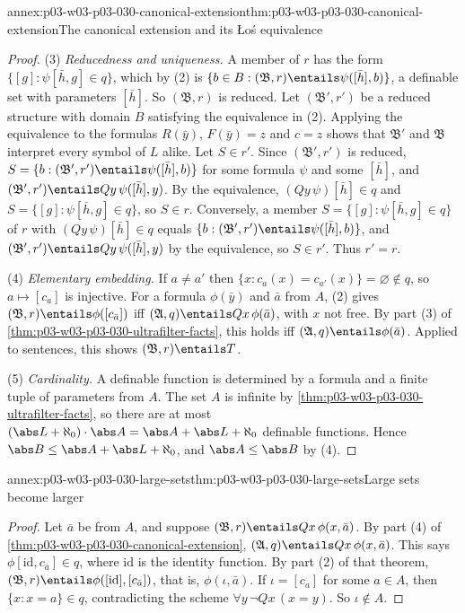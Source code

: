 \begin{annexitem}{annex:p03-w03-p03-030-canonical-extension}{thm:p03-w03-p03-030-canonical-extension}{The canonical extension and its \L o\'s equivalence}
\begin{proof}
(3) \emph{Reducedness and uniqueness.}  A member of \(r\) has the form
\(\{[g]:\psi[\bar h,g]\in q\}\), which by (2) is
\(\{b\in B:(\mathfrak B,r)\entails\psi([\bar h],b)\}\), a definable set with
parameters \([\bar h]\).  So \((\mathfrak B,r)\) is reduced.  Let
\((\mathfrak B',r')\) be a reduced structure with domain \(B\) satisfying the
equivalence in (2).  Applying the equivalence to the formulas
\(R(\bar y)\), \(F(\bar y)=z\) and \(c=z\) shows that \(\mathfrak B'\) and
\(\mathfrak B\) interpret every symbol of \(L\) alike.  Let \(S\in r'\).
Since \((\mathfrak B',r')\) is reduced, \(S=\{b:(\mathfrak B',r')\entails
\psi([\bar h],b)\}\) for some formula \(\psi\) and some \([\bar h]\), and
\((\mathfrak B',r')\entails Qy\,\psi([\bar h],y)\).  By the equivalence,
\((Qy\,\psi)[\bar h]\in q\) and \(S=\{[g]:\psi[\bar h,g]\in q\}\), so
\(S\in r\).  Conversely, a member \(S=\{[g]:\psi[\bar h,g]\in q\}\) of \(r\)
with \((Qy\,\psi)[\bar h]\in q\) equals \(\{b:(\mathfrak B',r')\entails
\psi([\bar h],b)\}\), and \((\mathfrak B',r')\entails Qy\,\psi([\bar h],y)\)
by the equivalence, so \(S\in r'\).  Thus \(r'=r\).

(4) \emph{Elementary embedding.}  If \(a\ne a'\) then
\(\{x:c_a(x)=c_{a'}(x)\}=\varnothing\notin q\), so \(a\mapsto[c_a]\) is
injective.  For a formula \(\phi(\bar y)\) and \(\bar a\) from \(A\), (2) gives
\((\mathfrak B,r)\entails\phi([c_{\bar a}])\) iff \((\mathfrak A,q)\entails
Qx\,\phi(\bar a)\), with \(x\) not free.  By part (3) of
\cref{thm:p03-w03-p03-030-ultrafilter-facts}, this holds iff
\((\mathfrak A,q)\entails\phi(\bar a)\).  Applied to sentences, this shows
\((\mathfrak B,r)\entails T\).

(5) \emph{Cardinality.}  A definable function is determined by a formula and
a finite tuple of parameters from \(A\).  The set \(A\) is infinite by
\cref{thm:p03-w03-p03-030-ultrafilter-facts}, so there are at most
\((\abs L+\aleph_0)\cdot\abs A=\abs A+\abs L+\aleph_0\) definable functions.
Hence \(\abs B\le\abs A+\abs L+\aleph_0\), and \(\abs A\le\abs B\) by (4).
\end{proof}
\end{annexitem}

\begin{annexitem}{annex:p03-w03-p03-030-large-sets}{thm:p03-w03-p03-030-large-sets}{Large sets become larger}
\begin{proof}
Let \(\bar a\) be from \(A\), and suppose \((\mathfrak B,r)\entails
Qx\,\phi(x,\bar a)\).  By part (4) of
\cref{thm:p03-w03-p03-030-canonical-extension},
\((\mathfrak A,q)\entails Qx\,\phi(x,\bar a)\).  This says
\(\phi[\mathrm{id},c_{\bar a}]\in q\), where \(\mathrm{id}\) is the identity
function.  By part (2) of that theorem,
\((\mathfrak B,r)\entails\phi([\mathrm{id}],[c_{\bar a}])\), that is,
\(\phi(\iota,\bar a)\).  If \(\iota=[c_a]\) for some \(a\in A\), then
\(\{x:x=a\}\in q\), contradicting the scheme \(\forall y\,\neg Qx\,(x=y)\).
So \(\iota\notin A\).
\end{proof}
\end{annexitem}


